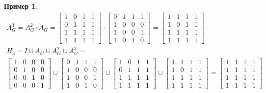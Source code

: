 \documentclass[fleqn, 12pt]{article}
\theoremstyle{definition}
\newtheorem{example}{Пример}[subsection]
\begin{document}
\begin{example}
\begin{gather*}
A_G ^3 = A_G ^2 \cdot A_G = 
\left[
\begin{matrix}
1& 0 & 1 & 1 \\
0 & 1 & 1 & 1 \\
1 & 1 & 1 & 1\\
1 & 1 & 1 & 1
\end{matrix} 
\right]
\cdot 
\left[
\begin{matrix}
0& 1 & 1 & 1 \\
1 & 0 & 0 & 0 \\
1 & 0 & 0 & 1\\
1 & 0 & 1 & 0
\end{matrix} 
\right] 
= 
\left[
\begin{matrix}
1& 1 & 1 & 1 \\
1 & 0 & 1 & 1 \\
1 & 1 & 1 & 1\\
1 & 1 & 1 & 1
\end{matrix} 
\right]\\
H_3 = I \cup A_G \cup A_G^2 \cup A_G^3 = \\
\left[
\begin{matrix}
1 & 0 & 0 & 0 \\
0 & 1 & 0 & 0 \\
0 & 0 & 1 & 0\\
0 & 0 & 0 & 1
\end{matrix} 
\right]
\cup
\left[
\begin{matrix}
0& 1 & 1 & 1 \\
1 & 0 & 0 & 0 \\
1 & 0 & 0 & 1\\
1 & 0 & 1 & 0
\end{matrix} 
\right]
\cup
\left[
\begin{matrix}
1& 0 & 1 & 1 \\
0 & 1 & 1 & 1 \\
1 & 1 & 1 & 1\\
1 & 1 & 1 & 1
\end{matrix} 
\right]
\cup
\left[
\begin{matrix}
1& 1 & 1 & 1 \\
1 & 0 & 1 & 1 \\
1 & 1 & 1 & 1\\
1 & 1 & 1 & 1
\end{matrix} 
\right]
= 
\left[
\begin{matrix}
1& 1 & 1 & 1 \\
1 & 1 & 1 & 1 \\
1 & 1 & 1 & 1\\
1 & 1 & 1 & 1
\end{matrix} 
\right]
\end{gather*}
\end{example}
\end{document}
